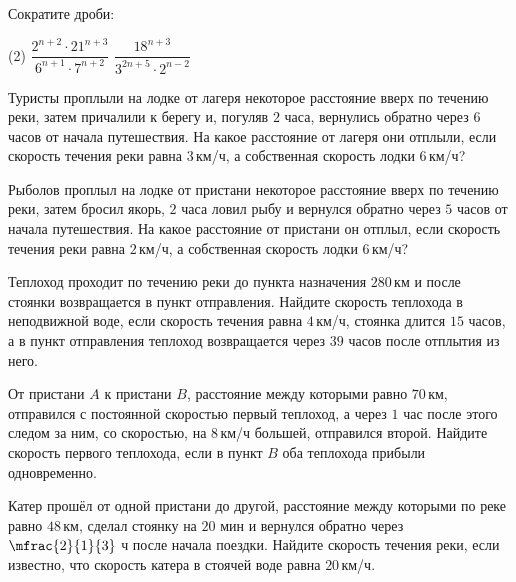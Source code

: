 \begin{class}[number=2]
	\begin{listofex}
	\item Сократите дроби:
		\begin{tasks}(2)
		\task \( \dfrac{2^{n+2}\cdot21^{n+3}}{6^{n+1}\cdot7^{n+2}} \)
		\task \( \dfrac{18^{n+3}}{3^{2n+5}\cdot2^{n-2}} \)
		\end{tasks}
	\item Туристы проплыли на лодке от лагеря некоторое расстояние вверх по течению реки, затем причалили к берегу и, погуляв \( 2 \) часа, вернулись обратно через 6 часов от начала путешествия. На какое расстояние от лагеря они отплыли, если скорость течения реки равна \( 3 \) км/ч, а собственная скорость лодки \( 6 \) км/ч?
	\item Рыболов проплыл на лодке от пристани некоторое расстояние вверх по течению реки, затем бросил якорь, \( 2 \) часа ловил рыбу и вернулся обратно через \( 5 \) часов от начала путешествия. На какое расстояние от пристани он отплыл, если скорость течения реки равна \( 2 \) км/ч, а собственная скорость лодки \( 6 \) км/ч?
	\item Теплоход проходит по течению реки до пункта назначения \( 280 \) км и после стоянки возвращается в пункт отправления. Найдите скорость теплохода в неподвижной воде, если скорость течения равна \( 4 \) км/ч, стоянка длится \( 15 \) часов, а в пункт отправления теплоход возвращается через \( 39 \) часов после отплытия из него.
	\item От пристани \( A \) к пристани \( B \), расстояние между которыми равно \( 70 \) км, отправился с постоянной скоростью первый теплоход, а через \( 1 \) час после этого следом за ним, со скоростью, на \( 8 \) км/ч большей, отправился второй. Найдите скорость первого теплохода, если в пункт \( B \) оба теплохода прибыли одновременно.
	\item Катер прошёл от одной пристани до другой, расстояние между которыми по реке равно \( 48 \) км, сделал стоянку на \( 20 \) мин и вернулся обратно через \( \mfrac{2}{1}{3} \) ч после начала поездки. Найдите скорость течения реки, если известно, что скорость катера в стоячей воде равна \( 20 \) км/ч.	
	\end{listofex}
\end{class}

